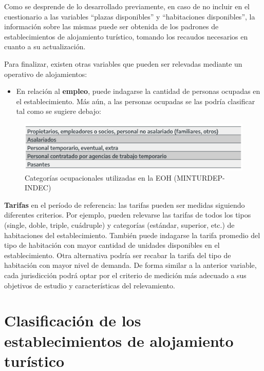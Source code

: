 \documentclass[
]{book}
\providecommand{\tightlist}{%
  \setlength{\itemsep}{0pt}\setlength{\parskip}{0pt}}
\begin{document}
Como se desprende de lo desarrollado previamente, en caso de no incluir en el cuestionario a las variables ``plazas disponibles'' y ``habitaciones disponibles'', la información sobre las mismas puede ser obtenida de los padrones de establecimientos de alojamiento turístico, tomando los recaudos necesarios en cuanto a su actualización.

Para finalizar, existen otras variables que pueden ser relevadas mediante un operativo de alojamientos:

\begin{itemize}
\tightlist
\item
  En relación al \textbf{empleo}, puede indagarse la cantidad de personas ocupadas en el establecimiento. Más aún, a las personas ocupadas se las podría clasificar tal como se sugiere debajo:
\end{itemize}

\begin{figure}

{\centering \includegraphics[width=1\linewidth]{imagenes/tabla_5} 

}

\caption{Categorías ocupacionales utilizadas en la EOH (MINTURDEP-INDEC)}\label{fig:ocupados}
\end{figure}

\textbf{Tarifas} en el período de referencia: las tarifas pueden ser medidas siguiendo diferentes criterios. Por ejemplo, pueden relevarse las tarifas de todos los tipos (single, doble, triple, cuádruple) y categorías (estándar, superior, etc.) de habitaciones del establecimiento. También puede indagarse la tarifa promedio del tipo de habitación con mayor cantidad de unidades disponibles en el establecimiento. Otra alternativa podría ser recabar la tarifa del tipo de habitación con mayor nivel de demanda. De forma similar a la anterior variable, cada jurisdicción podrá optar por el criterio de medición más adecuado a sus objetivos de estudio y características del relevamiento.\\

\hypertarget{clasificaciuxf3n-de-los-establecimientos-de-alojamiento-turuxedstico}{%
\section{Clasificación de los establecimientos de alojamiento turístico}\label{clasificaciuxf3n-de-los-establecimientos-de-alojamiento-turuxedstico}}
\end{document}
